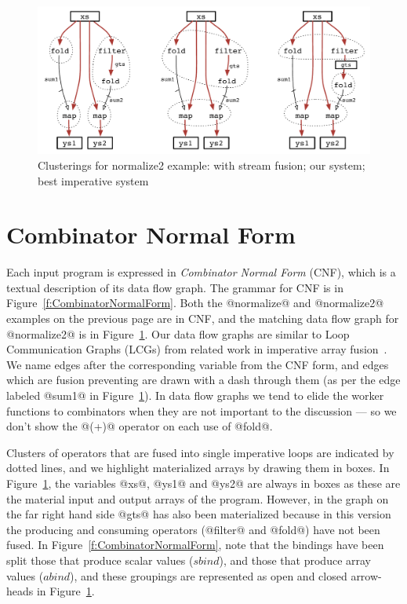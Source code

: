 
\begin{figure}[ht!]
\begin{center}
\includegraphics[scale=0.5]{figures/ex1-compare.pdf}
\end{center}
\caption{Clusterings for normalize2 example: with stream fusion; our system; best imperative system}
\label{f:normalize2-clusterings}
\end{figure}


\section{Combinator Normal Form}
Each input program is expressed in \emph{Combinator Normal Form} (CNF), which is a textual description of its data flow graph. The grammar for CNF is in Figure~\ref{f:CombinatorNormalForm}. Both the @normalize@ and @normalize2@ examples on the previous page are in CNF, and the matching data flow graph for @normalize2@ is in Figure~\ref{f:normalize2-clusterings}. Our data flow graphs are similar to Loop Communication Graphs (LCGs) from related work in imperative array fusion~\cite{gao1993collective}. We name edges after the corresponding variable from the CNF form, and edges which are fusion preventing are drawn with a dash through them (as per the edge labeled @sum1@ in Figure~\ref{f:normalize2-clusterings}). In data flow graphs we tend to elide the worker functions to combinators when they are not important to the discussion --- so we don't show the @(+)@ operator on each use of @fold@.

Clusters of operators that are fused into single imperative loops are indicated by dotted lines, and we highlight materialized arrays by drawing them in boxes. In Figure~\ref{f:normalize2-clusterings}, the variables @xs@, @ys1@ and @ys2@ are always in boxes as these are the material input and output arrays of the program. However, in the graph on the far right hand side @gts@ has also been materialized because in this version the producing and consuming operators (@filter@ and @fold@) have not been fused. In Figure~\ref{f:CombinatorNormalForm}, note that the bindings have been split those that produce scalar values ($sbind$), and those that produce array values ($abind$), and these groupings are represented as open and closed arrow-heads in Figure~\ref{f:normalize2-clusterings}.

